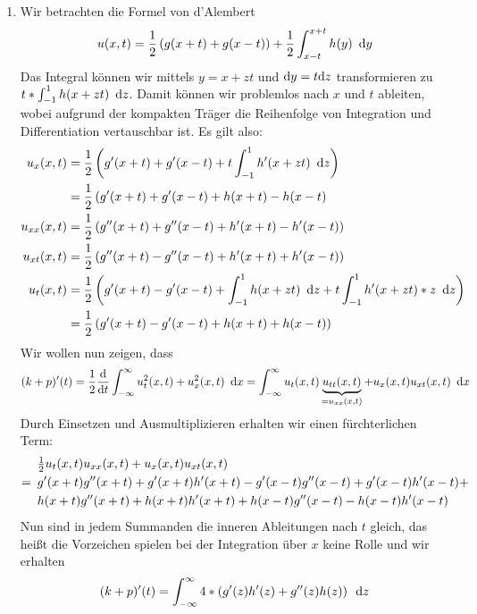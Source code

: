\begin{exercisePage}
	\begin{enumerate}[label=(zu \alph*), leftmargin=*]
		\item Wir betrachten die Formel von d'Alembert 
		\begin{equation*}
			u(x,t) = \frac{1}{2} \left( g(x+t) + g(x-t) \right) + \frac{1}{2} \int_{x-t}^{x+t} h(y) \enskip \mathrm{d}y
		\end{equation*}
		Das Integral können wir mittels $y=x+zt$ und $\mathrm{d}{y} = t \mathrm{d}{z}$ transformieren zu $t * \int_{-1}^1 h(x+zt) \enskip \mathrm{d}z$. Damit können wir problemlos nach $x$ und $t$ ableiten, wobei aufgrund der kompakten Träger die Reihenfolge von Integration und Differentiation vertauschbar ist. Es gilt also:
		\begin{align*}
			u_x(x,t) 
			&= \frac{1}{2} \left( g'(x+t) + g'(x-t) + t \int_{-1}^1 h'(x+zt) \enskip \mathrm{d}z \right) \\
			&= \frac{1}{2} \left( g'(x+t) + g'(x-t) + h(x+t) - h(x-t \right) \\
			u_{xx}(x,t) 
			&= \frac{1}{2} \left( g''(x+t) + g''(x-t) + h'(x+t)  - h'(x-t) \right) \\
			u_{xt}(x,t) 
			&= \frac{1}{2}  \left( g''(x+t) - g''(x-t) + h'(x+t) + h'(x-t) \right) \\
			u_t(x,t)
			&= \frac{1}{2} \left( g'(x+t) - g'(x-t) + \int_{-1}^1 h(x+zt) \enskip \mathrm{d}z + t \int_{-1}^1 h'(x+zt) * z \enskip \mathrm{d}z \right) \\
			&= \frac{1}{2} \left( g'(x+t) - g'(x-t) + h(x+t) + h(x-t) \right)
		\end{align*}
		Wir wollen nun zeigen, dass
		\begin{equation*}
			(k+p)'(t) = \frac{1}{2} \frac{\mathrm{d}}{\mathrm{d} t } \int_{-\infty}^\infty u_t^2(x,t) + u_x^2(x,t) \enskip \mathrm{d}x 
			= \int_{-\infty}^\infty  u_t(x,t) \underbrace{u_{tt}(x,t)}_{= u_{xx}(x,t)} + u_x(x,t) u_{xt}(x,t) \enskip \mathrm{d}x
		\end{equation*}
		Durch Einsetzen und Ausmultiplizieren erhalten wir einen fürchterlichen Term:
		\begin{align*}
			&\tfrac{1}{2} u_t(x,t) u_{xx}(x,t) + u_x(x,t) u_{xt}(x,t) \\
			= \enskip &g'(x+t)g''(x+t) + g'(x+t)h'(x+t) - g'(x-t)g''(x-t) + g'(x-t)h'(x-t) + \\ 
			&h(x+t)g''(x+t) + h(x+t)h'(x+t) + h(x-t) g''(x-t) - h(x-t) h'(x-t)
		\end{align*}
		Nun sind in jedem Summanden die inneren Ableitungen nach $t$ gleich, das heißt die Vorzeichen spielen bei der Integration über $x$ keine Rolle und wir erhalten
		\begin{equation*}
			(k+p)'(t) = \int_{-\infty}^\infty 4 * \brackets{ g'(z) h'(z) + g''(z) h(z) } \dz

\end{equation*}
\end{enumerate}
\end{exercisePage}
